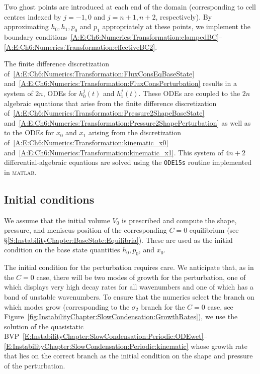 \begin{subappendices}
Two ghost points are introduced at each end of the domain (corresponding to cell centres indexed by $j = -1,0$ and $j = n+1, n+2$, respectively). By approximating $h_0, h_1,p_0$ and $p_1$ appropriately at these points, we implement the boundary conditions~\eqref{A:E:Ch6:Numerics:Transformation:clampedBC}--\eqref{A:E:Ch6:Numerics:Transformation:effectiveBC2}.

The finite difference discretization of~\eqref{A:E:Ch6:Numerics:Transformation:FluxConsEqBaseState} and~\eqref{A:E:Ch6:Numerics:Transformation:FluxConsPerturbation} results in a system of $2n$, ODEs for  $h_0^j(t)$ and $h_1^j(t)$. These ODEs are coupled to the $2n$ algebraic equations that arise from the finite difference discretization of~\eqref{A:E:Ch6:Numerics:Transformation:Pressure2ShapeBaseState} and~\eqref{A:E:Ch6:Numerics:Transformation:Pressure2ShapePerturbation} as well as to the ODEs for $x_0$ and $x_1$ arising from the discretization of~\eqref{A:E:Ch6:Numerics:Transformation:kinematic_x0} and~\eqref{A:E:Ch6:Numerics:Transformation:kinematic_x1}. This system of $4n+2$ differential-algebraic equations are solved using the \texttt{ODE15s} routine implemented in \textsc{matlab}.

\subsection{Initial conditions}
We assume that the initial volume $V_0$ is prescribed and compute the shape, pressure, and meniscus position of the corresponding $C = 0$ equilibrium (see \S\ref{S:InstabilityChapter:BaseState:Equilibria}). These are used as the initial condition on the base state quantities $h_0, p_0$, and $x_0$.

The initial condition for the perturbation requires care. We anticipate that, as in the $C = 0$ case, there will be two modes of growth for the perturbation, one of which displays very high decay rates for all wavenumbers and one of which has a band of unstable wavenumbers. To ensure that the numerics select the branch on which modes grow (corresponding to the $\sigma_2$ branch for the $C = 0$ case, see Figure~\ref{fig:InstabilityChapter:SlowCondensation:GrowthRates}), we use the solution of the quasistatic BVP~\eqref{E:InstabilityChapter:SlowCondensation:Periodic:ODEwet}--\eqref{E:InstabilityChapter:SlowCondensation:Periodic:kinematic} whose growth rate that lies on the correct branch as the initial condition on the shape and pressure of the perturbation.


\end{subappendices}
